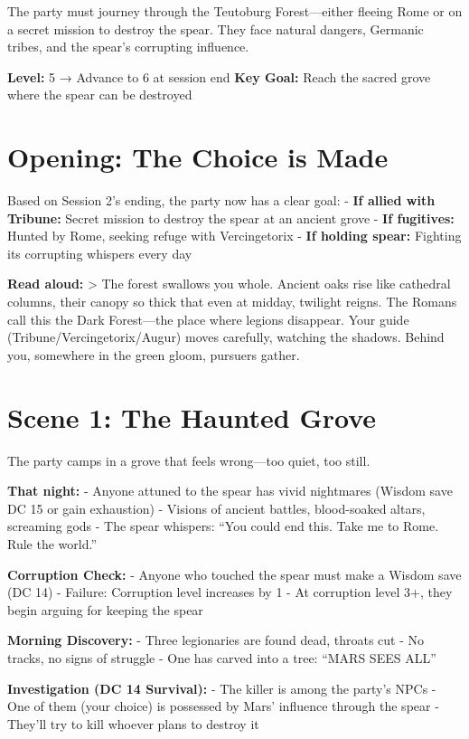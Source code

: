 \documentclass[
]{book}
\begin{document}
The party must journey through the Teutoburg Forest---either fleeing
Rome or on a secret mission to destroy the spear. They face natural
dangers, Germanic tribes, and the spear's corrupting influence.

\textbf{Level:} 5 → Advance to 6 at session end \textbf{Key Goal:} Reach
the sacred grove where the spear can be destroyed

\section{Opening: The Choice is Made}\label{opening-the-choice-is-made}

Based on Session 2's ending, the party now has a clear goal: -
\textbf{If allied with Tribune:} Secret mission to destroy the spear at
an ancient grove - \textbf{If fugitives:} Hunted by Rome, seeking refuge
with Vercingetorix - \textbf{If holding spear:} Fighting its corrupting
whispers every day

\textbf{Read aloud:} \textgreater{} The forest swallows you whole.
Ancient oaks rise like cathedral columns, their canopy so thick that
even at midday, twilight reigns. The Romans call this the Dark
Forest---the place where legions disappear. Your guide
(Tribune/Vercingetorix/Augur) moves carefully, watching the shadows.
Behind you, somewhere in the green gloom, pursuers gather.

\section{Scene 1: The Haunted Grove}\label{scene-1-the-haunted-grove}

The party camps in a grove that feels wrong---too quiet, too still.

\textbf{That night:} - Anyone attuned to the spear has vivid nightmares
(Wisdom save DC 15 or gain exhaustion) - Visions of ancient battles,
blood-soaked altars, screaming gods - The spear whispers: ``You could
end this. Take me to Rome. Rule the world.''

\textbf{Corruption Check:} - Anyone who touched the spear must make a
Wisdom save (DC 14) - Failure: Corruption level increases by 1 - At
corruption level 3+, they begin arguing for keeping the spear

\textbf{Morning Discovery:} - Three legionaries are found dead, throats
cut - No tracks, no signs of struggle - One has carved into a tree:
``MARS SEES ALL''

\textbf{Investigation (DC 14 Survival):} - The killer is among the
party's NPCs - One of them (your choice) is possessed by Mars' influence
through the spear - They'll try to kill whoever plans to destroy it
\end{document}
